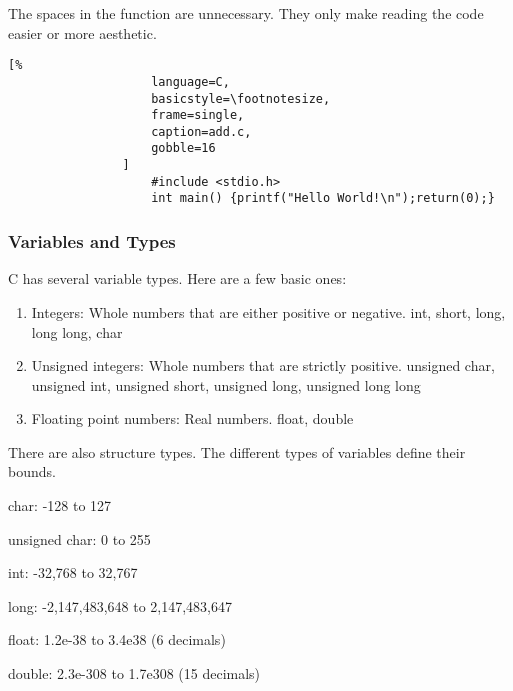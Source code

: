 \documentclass[crop=false,class=book,oneside]{standalone}
\begin{document}
                \newline
                The spaces in the function are unnecessary.
                They only make reading the code easier or more aesthetic.
                \begin{lstlisting}[%
                    language=C,
                    basicstyle=\footnotesize,
                    frame=single,
                    caption=add.c,
                    gobble=16
                ]
                    #include <stdio.h>
                    int main() {printf("Hello World!\n");return(0);}
                \end{lstlisting}
            \subsubsection{Variables and Types}
                C has several variable types. Here are a few basic ones:
                \begin{enumerate}
                    \item Integers: Whole numbers that are either
                        positive or negative. int, short, long,
                        long long, char
                    \item Unsigned integers: Whole numbers that are
                        strictly positive. unsigned char,
                        unsigned int, unsigned short, unsigned long,
                        unsigned long long
                    \item Floating point numbers: Real numbers.
                        float, double
                \end{enumerate}
                There are also structure types. The different types of
                variables define their bounds.
                \begin{itemize}
                    \begin{multicols}{2}
                        \item char: -128 to 127
                        \item unsigned char: 0 to 255
                        \item int: -32,768 to 32,767
                        \item long: -2,147,483,648 to 2,147,483,647
                        \item float: 1.2e-38 to 3.4e38 (6 decimals)
                        \item double: 2.3e-308 to 1.7e308 (15 decimals)
                    \end{multicols}
                \end{itemize}
\end{document}
